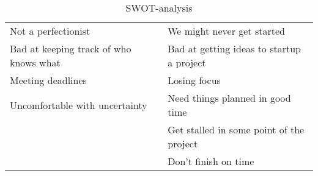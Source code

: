 \begin{table}[!ht]
\begin{tabular}{|p{}|p{}|}
Not a perfectionist                     & We might never get started\\
Bad at keeping track of who knows what  & Bad at getting ideas to startup a project\\ %
Meeting deadlines                       & Losing focus\\
Uncomfortable with uncertainty          & Need things planned in good time\\
                                        & Get stalled in some point of the project\\
                                        & Don't finish on time\\
\hline
\end{tabular}
\caption{SWOT-analysis}
\label{SWOT-table}
\end{table}